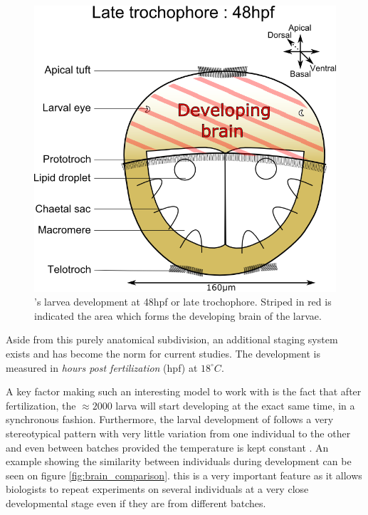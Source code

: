 \begin{figure}[bth]
\begin{center}
  \includegraphics[width=0.6\linewidth]{gfx/chapter1/larvae48hpf.png}
\end{center}
  \caption{\platyfull{}'s larvea development at 48hpf or late trochophore. Striped in red is indicated the area which forms the developing brain of the larvae.}
  \label{fig:platynereis_larvae_scheme}
\end{figure}
    
    Aside from this purely anatomical subdivision, an additional staging system exists and has become the norm for current studies. The development is measured in \textit{hours post fertilization} (hpf) at $18^{\circ}C$.
    
    A key factor making \platy{} such an interesting model to work with is the fact that after fertilization, the $\approx 2000$ larva will start developing at the exact same time, in a synchronous fashion. Furthermore, the larval development of \platy{} follows a very stereotypical pattern with very little variation from one individual to the other and even between batches provided the temperature is kept constant \cite{fischer04,dorresteijn90}. An example showing the similarity between individuals during development can be seen on figure \ref{fig:brain_comparison}. this is a very important feature as it allows biologists to repeat experiments on several individuals at a very close developmental stage even if they are from different batches.\\
    
